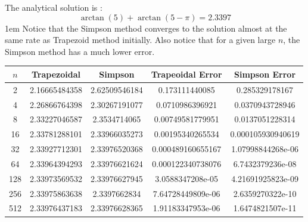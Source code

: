 \documentclass[12,a4paper]{article}
\begin{document}
    The analytical solution is :
    \begin{equation}
        \nonumber
        \arctan(5)+\arctan(5-\pi) = 2.3397
    \end{equation}
    \parskip1em
    Notice that the Simpson method converges to the solution almost at the same rate as Trapezoid method initially. Also notice that for a given large $n$,  the Simpson method has a much lower error.
    
    \renewcommand{\arraystretch}{1.5}
    \begin{table}[H]
        \centering
        \begin{tabular}{ |c|c|c|c|c| }
            \hline
            $n$ & \textbf{Trapezoidal} & \textbf{Simpson} & \textbf{Trapeoidal Error} & \textbf{Simpson Error}\\
            \hline
            2 & 2.16665484358 & 2.62509546184 & 0.173111440085 & 0.285329178167 \\
            4 & 2.26866764398 & 2.30267191077 & 0.0710986396921 & 0.0370943728946 \\
            8 & 2.33227046587 & 2.3534714065 & 0.00749581779951 & 0.0137051228314 \\
            16 & 2.33781288101 & 2.33966035273 & 0.00195340265534 & 0.000105930940619 \\
            32 & 2.33927712301 & 2.33976520368 & 0.000489160655167 & 1.07998844268e-06 \\
            64 & 2.33964394293 & 2.33976621624 & 0.000122340738076 & 6.7432379236e-08 \\
            128 & 2.33973569532 & 2.33976627945 & 3.0588347208e-05 & 4.21691925823e-09 \\
            256 & 2.33975863638 & 2.3397662834 & 7.64728449809e-06 & 2.6359270322e-10 \\
            512 & 2.33976437183 & 2.33976628365 & 1.91183347953e-06 & 1.6474821507e-11 \\
            \hline
        \end{tabular}
    \end{table}
    \newpage
\end{document}
